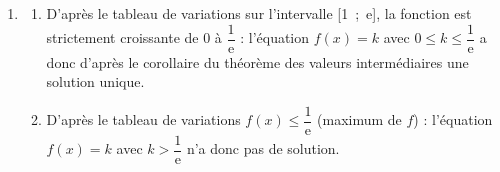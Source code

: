 \begin{enumerate}
\begin{enumerate}
		\item $f(1)=0$ et $f(\text e) = \dfrac{1}{\text e}$; on dresse le tableau de variations  de la fonction $f$ sur $[1~;~+\infty[$.

\begin{center}
{\renewcommand{\arraystretch}{1.1}
\def\esp{\hspace*{2.5cm}}%
\def\hauteur{0pt}%
$\begin{array}{|c|*5{c}|}
\hline
x & 1  & \esp & \text e & \esp & +\infty \\ 
\hline
f'(x) &  &   \pmb{+} & \vline\hspace{-2.7pt}0 & \pmb{-} & \\ 
\hline
 & &  &   \Rnode{max}{\frac{1}{\text e}}  &  &   \\  
f(x) & &     &  &  &  \rule{0pt}{\hauteur} \\ 
 & \Rnode{min1}{0} &   &  &  &   \Rnode{min2}{0} \rule{0pt}{\hauteur}    
 \ncline{->}{min1}{max} 
 \ncline{->}{max}{min2} 
 \\ 
\hline
\end{array} $
}
\end{center}	

	\end{enumerate}
\item %
	\begin{enumerate}
		\item %
D'après le tableau de variations sur l'intervalle [1~;~e], la fonction est strictement croissante de $0$ à $\dfrac{1}{\text{e}}$ : l'équation $f(x) = k$ avec $0 \leqslant k \leqslant \dfrac{1}{\text{e}}$ a donc d'après le corollaire du théorème des valeurs intermédiaires une solution unique.

		\item %

D'après le tableau de variations $f(x) \leqslant \dfrac{1}{\text{e}}$ (maximum de $f$) : l'équation $f(x) = k$ avec $k > \dfrac{1}{\text{e}}$ n'a donc pas de solution.
	\end{enumerate}
\end{enumerate}

